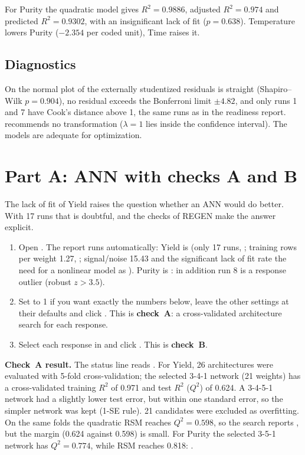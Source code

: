 For Purity the quadratic model gives $R^2=0.9886$, adjusted $R^2=0.974$ and predicted $R^2=0.9302$, with an
insignificant lack of fit ($p=0.638$). Temperature lowers Purity ($-2.354$ per coded unit), Time raises it.

\subsection{Diagnostics}
On  the normal plot of the externally studentized residuals is straight (Shapiro--Wilk $p=0.904$), no
residual exceeds the Bonferroni limit $\pm4.82$, and only runs 1 and 7 have Cook's distance above 1, the same runs as in
the readiness report.  recommends no transformation ($\lambda=1$ lies inside the confidence interval).
The models are adequate for optimization.

\section{Part A: ANN with checks A and B}
\label{sec:ch11-ann-bbd}
The lack of fit of Yield raises the question whether an ANN would do better. With 17 runs that is doubtful, and the
checks of REGEN make the answer explicit.

\begin{enumerate}
  \item Open . The  report runs automatically: Yield is  (only 17
        runs, ; training rows per weight 1.27, ; signal/noise 15.43 and the significant lack of
        fit rate the need for a nonlinear model as ). Purity is : in addition run 8 is a response outlier (robust $z>3.5$).
  \item Set  to 1 if you want exactly the numbers below, leave the other settings at their
        defaults and click . This is \textbf{check~A}: a cross-validated
        architecture search for each response.
  \item Select each response in  and click . This is
        \textbf{check~B}.
\end{enumerate}

\textbf{Check~A result.} The status line reads .
For Yield, 26 architectures were evaluated with 5-fold cross-validation; the selected 3-4-1 network (21 weights) has a
cross-validated training $R^2$ of 0.971 and test $R^2$ ($Q^2$) of 0.624. A 3-4-5-1 network had a slightly lower test
error, but within one standard error, so the simpler network was kept (1-SE rule). 21 candidates were excluded as
overfitting. On the same folds the quadratic RSM reaches $Q^2=0.598$, so the search reports , but the margin (0.624 against 0.598) is small. For Purity the
selected 3-5-1 network has $Q^2=0.774$, while RSM reaches 0.818: .

